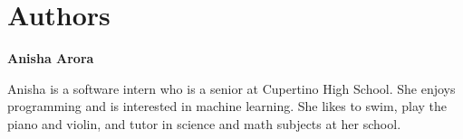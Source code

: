 {{{




























\newpage
\section{Authors}

\textbf{Anisha Arora}

Anisha is a software intern who is a senior at Cupertino High School. She enjoys programming and is interested in machine learning. She likes to swim, play the piano and violin, and tutor in science and math subjects at her school.

}}}
